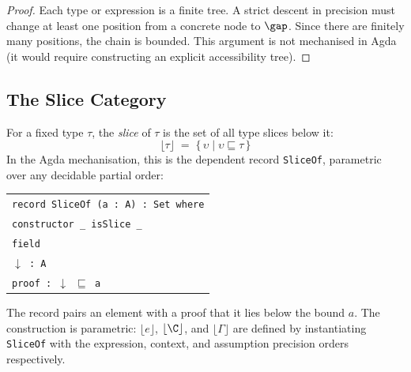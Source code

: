 \begin{proof}
Each type or expression is a finite tree. A strict descent in precision must change at least one position from a concrete node to $\gap$. Since there are finitely many positions, the chain is bounded. This argument is not mechanised in Agda (it would require constructing an explicit accessibility tree).
\end{proof}

\subsection{The Slice Category}
\label{sec:slice-category}

For a fixed type $\tau$, the \textit{slice} of $\tau$ is the set of all type slices below it:
\[\lfloor\tau\rfloor \;=\; \{\,\upsilon \mid \upsilon \sqsubseteq \tau\,\}\]
In the Agda mechanisation, this is the dependent record \texttt{SliceOf}, parametric over any decidable partial order:
\begin{center}
\begin{tabular}{l}
\texttt{record SliceOf (a : A) : Set where} \\
\texttt{\quad constructor \_ isSlice \_} \\
\texttt{\quad field} \\
\texttt{\quad\quad $\downarrow$\;\;\; : A} \\
\texttt{\quad\quad proof : $\downarrow$ $\sqsubseteq$ a}
\end{tabular}
\end{center}
The record pairs an element with a proof that it lies below the bound $a$. The construction is parametric: $\lfloor e \rfloor$, $\lfloor \C \rfloor$, and $\lfloor \Gamma \rfloor$ are defined by instantiating \texttt{SliceOf} with the expression, context, and assumption precision orders respectively.

